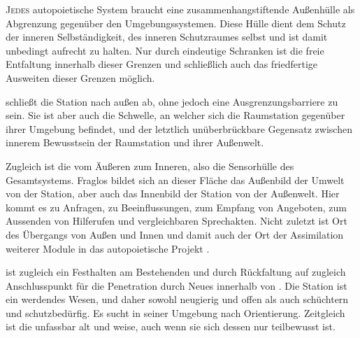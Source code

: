     \begin{newstuff}
        \lettrine{J}{edes} autopoietische System braucht eine zusammenhangstiftende Außenhülle als  Abgrenzung gegenüber den Umgebungssystemen. Diese Hülle dient dem Schutz der inneren Selbständigkeit, des inneren Schutzraumes selbst und ist damit unbedingt aufrecht zu halten. Nur durch eindeutige Schranken ist die freie Entfaltung innerhalb dieser Grenzen und schließlich auch das friedfertige Ausweiten dieser Grenzen möglich.


         schließt die Station nach außen ab, ohne jedoch eine Ausgrenzungsbarriere zu sein. Sie ist aber auch die Schwelle, an welcher sich die Raumstation gegenüber ihrer Umgebung befindet, und der letztlich unüberbrückbare Gegensatz zwischen innerem Bewusstsein der Raumstation und ihrer Außenwelt. {\color{white}}
        
        Zugleich ist  die  vom Äußeren zum Inneren, also die Sensorhülle des Gesamtsystems. Fraglos bildet sich an dieser Fläche das Außenbild der Umwelt von der Station, aber auch das Innenbild der Station von der Außenwelt. Hier kommt es zu Anfragen, zu Beeinflussungen, zum Empfang von Angeboten, zum Aussenden von Hilferufen und vergleichbaren Sprechakten. Nicht zuletzt ist  Ort des Übergangs von Außen und Innen und damit auch der Ort der Assimilation weiterer Module in das autopoietische Projekt .
        
         ist zugleich ein Festhalten am Bestehenden und durch Rückfaltung auf  zugleich Anschlusspunkt für die Penetration durch Neues innerhalb von . Die Station ist ein werdendes Wesen, und daher sowohl neugierig und offen als auch schüchtern und schutzbedürfig. Es sucht in seiner Umgebung nach Orientierung. Zeitgleich ist die  unfassbar alt und weise, auch wenn sie sich dessen nur teilbewusst ist.
        

\end{newstuff}
